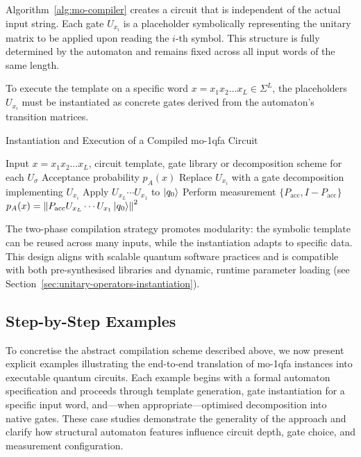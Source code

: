 Algorithm~\ref{alg:mo-compiler} creates a circuit that is independent of the actual input string. Each gate $\boxed{U_{x_i}}$ is a placeholder symbolically representing the unitary matrix to be applied upon reading the $i$-th symbol. This structure is fully determined by the automaton and remains fixed across all input words of the same length.

\medskip

To execute the template on a specific word $x = x_1 x_2 \dots x_L \in \Sigma^L$, the placeholders $\boxed{U_{x_i}}$ must be instantiated as concrete gates derived from the automaton's transition matrices.

\begin{algorithm}[H]
\caption{Instantiation and Execution of a Compiled \gls{mo-1qfa} Circuit}
\label{alg:mo-instantiation}
\begin{algorithmic}[1]
\Require Input $x = x_1x_2\dots x_L$, circuit template, gate library or decomposition scheme for each $U_\sigma$
\Ensure Acceptance probability $p_A(x)$
   \State Replace $\boxed{U_{x_i}}$ with a gate decomposition implementing $U_{x_i}$
\EndFor
\State Apply $U_{x_L} \cdots U_{x_1}$ to $\ket{q_0}$
\State Perform measurement $\{P_{\text{acc}}, I - P_{\text{acc}}\}$
\State \Return $p_A(x) = \left\|P_{\text{acc}} U_{x_L} \cdots U_{x_1} \ket{q_0}\right\|^2$
\end{algorithmic}
\end{algorithm}

The two-phase compilation strategy promotes modularity: the symbolic template can be reused across many inputs, while the instantiation adapts to specific data. This design aligns with scalable quantum software practices and is compatible with both pre-synthesised libraries and dynamic, runtime parameter loading (see Section~\ref{sec:unitary-operators-instantiation}).


\subsection{Step-by-Step Examples}
To concretise the abstract compilation scheme described above, we now present explicit examples illustrating the end-to-end translation of \gls{mo-1qfa} instances into executable quantum circuits. Each example begins with a formal automaton specification and proceeds through template generation, gate instantiation for a specific input word, and—when appropriate—optimised decomposition into native gates. These case studies demonstrate the generality of the approach and clarify how structural automaton features influence circuit depth, gate choice, and measurement configuration.
